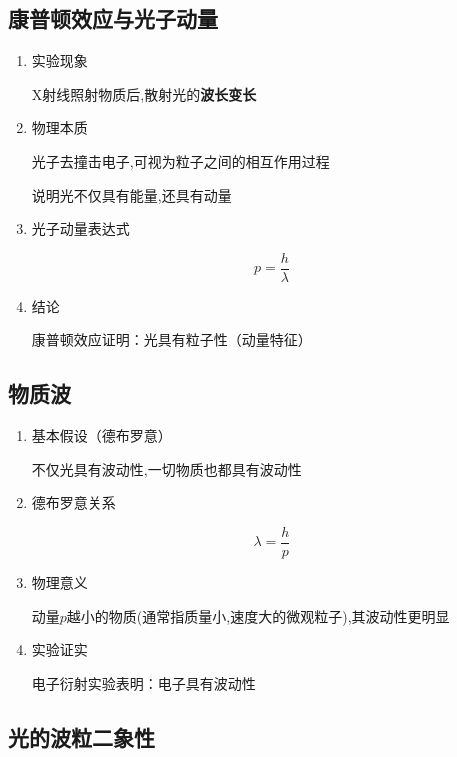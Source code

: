 \documentclass{article}
\begin{document}
\vspace{2em}
\subsection{康普顿效应与光子动量}

\begin{enumerate}
    \item 实验现象

          X射线照射物质后,散射光的\textbf{波长变长}

    \item 物理本质

          光子去撞击电子,可视为粒子之间的相互作用过程

          说明光不仅具有能量,还具有动量

    \item 光子动量表达式

          $$
              p = \frac{h}{\lambda}
          $$

    \item 结论

          康普顿效应证明：光具有粒子性（动量特征）
\end{enumerate}

\newpage

\subsection{物质波}

\begin{enumerate}
    \item 基本假设（德布罗意）

          不仅光具有波动性,一切物质也都具有波动性

    \item 德布罗意关系

          $$
              \lambda = \frac{h}{p}
          $$

    \item 物理意义

          动量$p$越小的物质(通常指质量小,速度大的微观粒子),其波动性更明显

    \item 实验证实

          电子衍射实验表明：电子具有波动性
\end{enumerate}

\vspace{2em}

\subsection{光的波粒二象性}
\end{document}
